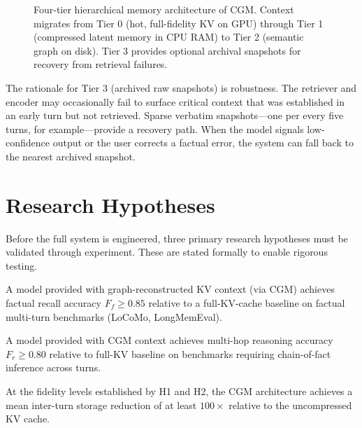 \documentclass[11pt, a4paper, twoside]{article}
\theoremstyle{definition}
\newcommand{\CGM}{\textsc{CGM}\xspace}
\begin{document}
\begin{figure}[H]
\caption{Four-tier hierarchical memory architecture of \CGM. Context migrates
from Tier 0 (hot, full-fidelity KV on GPU) through Tier 1 (compressed latent
memory in CPU RAM) to Tier 2 (semantic graph on disk). Tier 3 provides optional
archival snapshots for recovery from retrieval failures.}
\label{fig:hierarchy}
\end{figure}

The rationale for Tier 3 (archived raw snapshots) is robustness. The retriever
and encoder may occasionally fail to surface critical context that was established
in an early turn but not retrieved. Sparse verbatim snapshots---one per every five
turns, for example---provide a recovery path. When the model signals low-confidence
output or the user corrects a factual error, the system can fall back to the nearest
archived snapshot.

\section{Research Hypotheses}
\label{sec:hypotheses}

Before the full system is engineered, three primary research hypotheses must be
validated through experiment. These are stated formally to enable rigorous testing.

\medskip

\begin{description}[leftmargin=*, style=nextline]
  \item[\textbf{H1 --- Factual Fidelity Hypothesis}:] A model provided with
    graph-reconstructed KV context (via \CGM) achieves factual recall accuracy
    $F_f \geq 0.85$ relative to a full-KV-cache baseline on factual multi-turn
    benchmarks (LoCoMo, LongMemEval).
    
  \item[\textbf{H2 --- Reasoning Preservation Hypothesis}:] A model provided with
    \CGM context achieves multi-hop reasoning accuracy $F_r \geq 0.80$ relative to
    full-KV baseline on benchmarks requiring chain-of-fact inference across turns.
    
  \item[\textbf{H3 --- Compression Viability Hypothesis}:] At the fidelity levels
    established by H1 and H2, the \CGM architecture achieves a mean inter-turn
    storage reduction of at least $100\times$ relative to the uncompressed KV cache.
\end{description}
\end{document}
